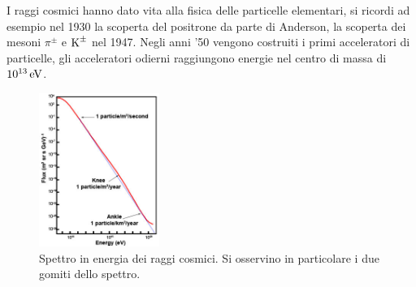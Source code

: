 I raggi cosmici hanno dato vita alla fisica delle particelle elementari, si ricordi ad esempio nel 1930 la scoperta del positrone da parte di Anderson, la scoperta dei mesoni $\pi^\pm$ e $\textup{K}^\pm$ nel 1947. Negli anni '50 vengono costruiti i primi acceleratori di particelle, gli acceleratori odierni raggiungono energie nel centro di massa di $10^{13}\,\textup{eV}$.

\begin{figure}[H]
    \centering
    \includegraphics[width=0.35\textwidth]{img/cosmicrayenergies1.jpg}
    \caption{Spettro in energia dei raggi cosmici. Si osservino in particolare i due gomiti dello spettro.}    
    \label{img:cosmicrays}
\end{figure}

